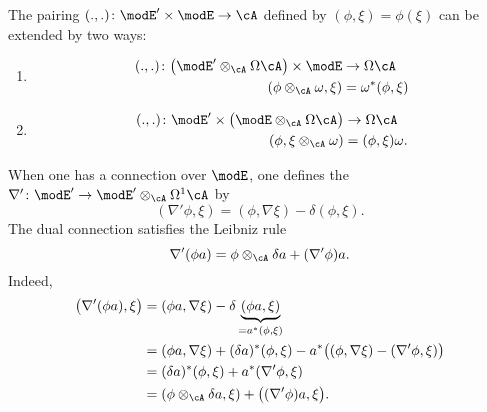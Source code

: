 The pairing $(.,.)\colon \modE'\times\modE\to \cA$ defined by $(\phi,\xi)=\phi(\xi)$ can be extended by two ways:
\begin{enumerate}
	\item
	      \begin{equation}
		      \begin{aligned}
			      (.,.)\colon \big( \modE'\otimes_{\cA}\Omega\cA \big)\times\modE & \to \Omega\cA       \\
			      (\phi\otimes_{\cA}\omega,\xi)                                   & =\omega^*(\phi,\xi)
		      \end{aligned}
	      \end{equation}
	\item
	      \begin{equation}
		      \begin{aligned}
			      (.,.)\colon \modE'\times\big( \modE\otimes_{\cA}\Omega\cA \big) & \to \Omega\cA      \\
			      (\phi,\xi\otimes_{\cA}\omega)                                   & =(\phi,\xi)\omega.
		      \end{aligned}
	      \end{equation}
\end{enumerate}
When one has a connection over $\modE$, one defines the  $\nabla'\colon \modE'\to \modE'\otimes_{\cA}\Omega^1\cA$ by
\begin{equation}
	(\nabla'\phi,\xi)=(\phi,\nabla\xi)-\delta(\phi,\xi).
\end{equation}
The dual connection satisfies the Leibniz rule
\begin{equation}
	\nabla'(\phi a)=\phi\otimes_{\cA}\delta a+(\nabla'\phi)a.
\end{equation}
Indeed,
\begin{align*}
	\big( \nabla'(\phi a),\xi \big) & =(\phi a,\nabla\xi)-\delta\underbrace{(\phi a,\xi)}_{=a^*(\phi,\xi)}                         \\
	                                & =(\phi a,\nabla\xi)+(\delta a)^*(\phi,\xi)-a^*\big( (\phi,\nabla\xi)-(\nabla'\phi,\xi) \big) \\
	                                & =(\delta a)^*(\phi,\xi)+a^*(\nabla'\phi,\xi)                                                 \\
	                                & =(\phi\otimes_{\cA}\delta a,\xi)+\big( (\nabla'\phi)a,\xi \big).
\end{align*}

